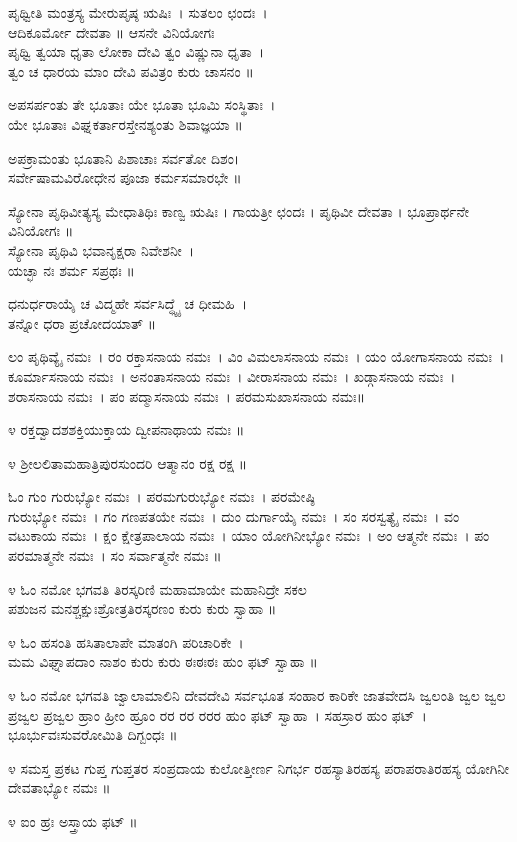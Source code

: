 ಪೃಥ್ವೀತಿ ಮಂತ್ರಸ್ಯ ಮೇರುಪೃಷ್ಠ ಋಷಿಃ~। ಸುತಲಂ ಛಂದಃ~।\\ಆದಿಕೂರ್ಮೋ ದೇವತಾ ॥ ಆಸನೇ ವಿನಿಯೋಗಃ\\
ಪೃಥ್ವಿ ತ್ವಯಾ ಧೃತಾ ಲೋಕಾ ದೇವಿ ತ್ವಂ ವಿಷ್ಣುನಾ ಧೃತಾ~।\\
ತ್ವಂ ಚ ಧಾರಯ ಮಾಂ ದೇವಿ ಪವಿತ್ರಂ ಕುರು ಚಾಸನಂ ॥

ಅಪಸರ್ಪಂತು ತೇ ಭೂತಾಃ ಯೇ ಭೂತಾ ಭೂಮಿ ಸಂಸ್ಥಿತಾಃ~।\\
ಯೇ ಭೂತಾಃ ವಿಘ್ನಕರ್ತಾರಸ್ತೇನಶ್ಯಂತು ಶಿವಾಜ್ಞಯಾ ॥

ಅಪಕ್ರಾಮಂತು ಭೂತಾನಿ ಪಿಶಾಚಾಃ ಸರ್ವತೋ ದಿಶಂ।\\
ಸರ್ವೇಷಾಮವಿರೋಧೇನ ಪೂಜಾ ಕರ್ಮಸಮಾರಭೇ ॥

ಸ್ಯೋನಾ ಪೃಥಿವೀತ್ಯಸ್ಯ ಮೇಧಾತಿಥಿಃ ಕಾಣ್ವ ಋಷಿಃ । ಗಾಯತ್ರೀ ಛಂದಃ । ಪೃಥಿವೀ ದೇವತಾ । ಭೂಪ್ರಾರ್ಥನೇ ವಿನಿಯೋಗಃ ॥\\
ಸ್ಯೋನಾ ಪೃಥಿವಿ ಭವಾನೃಕ್ಷರಾ ನಿವೇಶನೀ~।\\ ಯಚ್ಛಾ ನಃ ಶರ್ಮ ಸಪ್ರಥಃ ॥

ಧನುರ್ಧರಾಯೈ ಚ ವಿದ್ಮಹೇ ಸರ್ವಸಿದ್ಧ್ಯೈ ಚ ಧೀಮಹಿ~।\\ ತನ್ನೋ ಧರಾ ಪ್ರಚೋದಯಾತ್ ॥

ಲಂ ಪೃಥಿವ್ಯೈ ನಮಃ~। ರಂ ರಕ್ತಾಸನಾಯ ನಮಃ~। ವಿಂ ವಿಮಲಾಸನಾಯ ನಮಃ~। ಯಂ ಯೋಗಾಸನಾಯ ನಮಃ~। ಕೂರ್ಮಾಸನಾಯ ನಮಃ~। ಅನಂತಾಸನಾಯ ನಮಃ~। ವೀರಾಸನಾಯ ನಮಃ~। ಖಡ್ಗಾಸನಾಯ ನಮಃ~। ಶರಾಸನಾಯ ನಮಃ~। ಪಂ ಪದ್ಮಾಸನಾಯ ನಮಃ~। ಪರಮಸುಖಾಸನಾಯ ನಮಃ॥

೪ ರಕ್ತದ್ವಾದಶಶಕ್ತಿಯುಕ್ತಾಯ ದ್ವೀಪನಾಥಾಯ ನಮಃ ॥

೪ ಶ್ರೀಲಲಿತಾಮಹಾತ್ರಿಪುರಸುಂದರಿ ಆತ್ಮಾನಂ ರಕ್ಷ ರಕ್ಷ ॥

ಓಂ ಗುಂ ಗುರುಭ್ಯೋ ನಮಃ~। ಪರಮಗುರುಭ್ಯೋ ನಮಃ~। ಪರಮೇಷ್ಠಿ\\ಗುರುಭ್ಯೋ ನಮಃ~। ಗಂ ಗಣಪತಯೇ ನಮಃ~। ದುಂ ದುರ್ಗಾಯೈ ನಮಃ~। ಸಂ ಸರಸ್ವತ್ಯೈ ನಮಃ~। ವಂ ವಟುಕಾಯ ನಮಃ~। ಕ್ಷಂ ಕ್ಷೇತ್ರಪಾಲಾಯ ನಮಃ~। ಯಾಂ ಯೋಗಿನೀಭ್ಯೋ ನಮಃ~। ಅಂ ಆತ್ಮನೇ ನಮಃ~। ಪಂ ಪರಮಾತ್ಮನೇ ನಮಃ~। ಸಂ ಸರ್ವಾತ್ಮನೇ ನಮಃ ॥

೪ ಓಂ ನಮೋ ಭಗವತಿ ತಿರಸ್ಕರಿಣಿ ಮಹಾಮಾಯೇ ಮಹಾನಿದ್ರೇ ಸಕಲ \\ಪಶುಜನ ಮನಶ್ಚಕ್ಷುಃಶ್ರೋತ್ರತಿರಸ್ಕರಣಂ ಕುರು ಕುರು ಸ್ವಾಹಾ ॥

೪ ಓಂ ಹಸಂತಿ ಹಸಿತಾಲಾಪೇ ಮಾತಂಗಿ ಪರಿಚಾರಿಕೇ~।\\
ಮಮ ವಿಘ್ನಾಪದಾಂ ನಾಶಂ ಕುರು ಕುರು ಠಃಠಃಠಃ ಹುಂ ಫಟ್ ಸ್ವಾಹಾ ॥

೪ ಓಂ ನಮೋ ಭಗವತಿ ಜ್ವಾಲಾಮಾಲಿನಿ ದೇವದೇವಿ ಸರ್ವಭೂತ  ಸಂಹಾರ ಕಾರಿಕೇ ಜಾತವೇದಸಿ ಜ್ವಲಂತಿ ಜ್ವಲ ಜ್ವಲ ಪ್ರಜ್ವಲ ಪ್ರಜ್ವಲ ಹ್ರಾಂ ಹ್ರೀಂ ಹ್ರೂಂ ರರ ರರ ರರರ ಹುಂ ಫಟ್ ಸ್ವಾಹಾ~। ಸಹಸ್ರಾರ ಹುಂ ಫಟ್~।\\ ಭೂರ್ಭುವಃಸುವರೋಮಿತಿ ದಿಗ್ಬಂಧಃ ॥

೪ ಸಮಸ್ತ ಪ್ರಕಟ ಗುಪ್ತ ಗುಪ್ತತರ ಸಂಪ್ರದಾಯ ಕುಲೋತ್ತೀರ್ಣ ನಿಗರ್ಭ ರಹಸ್ಯಾ\-ತಿರಹಸ್ಯ ಪರಾಪರಾತಿರಹಸ್ಯ ಯೋಗಿನೀ ದೇವತಾಭ್ಯೋ ನಮಃ ॥

೪ ಐಂ ಹ್ರಃ ಅಸ್ತ್ರಾಯ ಫಟ್ ॥

